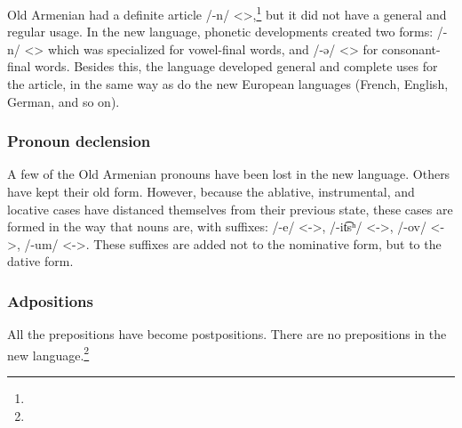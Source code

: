 Old Armenian had a definite article /-n/ <>,\footnote{} but it did not have a general and regular usage. In the new language, phonetic developments created two forms: /-n/ <> which was specialized for vowel-final words, and /-ə/ <> for consonant-final words. Besides this, the language developed general and complete uses for the article, in the same way as do the new European languages (French, English, German, and so on). 




\begin{adjarianpage}\label{page:22}\end{adjarianpage}%

\subsubsection{Pronoun declension}
A few of the Old Armenian pronouns have been lost in the new language. Others have kept their old form. However, because the ablative, instrumental, and locative cases have distanced themselves from their previous state, these cases are formed in the way that nouns are, with suffixes: {\abl} /-e/ <->, {\abl} /-it͡sʰ/ <->, {\ins} /-ov/ <->, {\locgloss} /-um/ <->. These suffixes are added not to the nominative form, but to the dative form.

\subsubsection{Adpositions}
All the prepositions have become postpositions. There are no prepositions in the new language.\footnote{}


